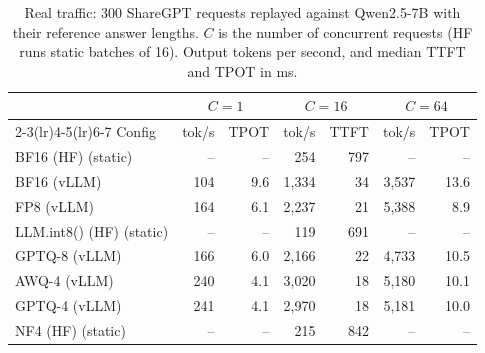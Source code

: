 \begin{table}[htbp]
\centering
\small
\caption{Real traffic: 300 ShareGPT requests replayed against Qwen2.5-7B with their reference answer lengths. $C$ is the number of concurrent requests (HF runs static batches of 16). Output tokens per second, and median TTFT and TPOT in ms.}
\label{tab:serving_main}
\setlength{\tabcolsep}{5pt}
\begin{tabular}{lrrrrrr}
\toprule
 & \multicolumn{2}{c}{$C=1$} & \multicolumn{2}{c}{$C=16$} & \multicolumn{2}{c}{$C=64$} \\
\cmidrule(lr){2-3}\cmidrule(lr){4-5}\cmidrule(lr){6-7}
Config & tok/s & TPOT & tok/s & TTFT & tok/s & TPOT \\
\midrule
BF16 (HF) (static) & -- & -- & 254 & 797 & -- & -- \\
BF16 (vLLM) & 104 & 9.6 & 1,334 & 34 & 3,537 & 13.6 \\
FP8 (vLLM) & 164 & 6.1 & 2,237 & 21 & 5,388 & 8.9 \\
LLM.int8() (HF) (static) & -- & -- & 119 & 691 & -- & -- \\
GPTQ-8 (vLLM) & 166 & 6.0 & 2,166 & 22 & 4,733 & 10.5 \\
AWQ-4 (vLLM) & 240 & 4.1 & 3,020 & 18 & 5,180 & 10.1 \\
GPTQ-4 (vLLM) & 241 & 4.1 & 2,970 & 18 & 5,181 & 10.0 \\
NF4 (HF) (static) & -- & -- & 215 & 842 & -- & -- \\
\midrule
\bottomrule
\end{tabular}
\end{table}
